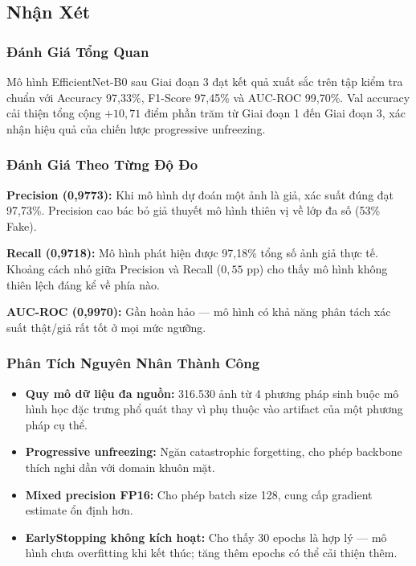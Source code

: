 \subsection{Nhận Xét}

\subsubsection{Đánh Giá Tổng Quan}

Mô hình EfficientNet-B0 sau Giai đoạn 3 đạt kết quả xuất sắc trên tập kiểm tra chuẩn với Accuracy 97,33\%, F1-Score 97,45\% và AUC-ROC 99,70\%. Val accuracy cải thiện tổng cộng $+10{,}71$ điểm phần trăm từ Giai đoạn 1 đến Giai đoạn 3, xác nhận hiệu quả của chiến lược progressive unfreezing.

\subsubsection{Đánh Giá Theo Từng Độ Đo}

\textbf{Precision (0,9773):} Khi mô hình dự đoán một ảnh là giả, xác suất đúng đạt 97,73\%. Precision cao bác bỏ giả thuyết mô hình thiên vị về lớp đa số (53\% Fake).

\textbf{Recall (0,9718):} Mô hình phát hiện được 97,18\% tổng số ảnh giả thực tế. Khoảng cách nhỏ giữa Precision và Recall ($0{,}55$ pp) cho thấy mô hình không thiên lệch đáng kể về phía nào.

\textbf{AUC-ROC (0,9970):} Gần hoàn hảo --- mô hình có khả năng phân tách xác suất thật/giả rất tốt ở mọi mức ngưỡng.

\subsubsection{Phân Tích Nguyên Nhân Thành Công}

\begin{itemize}
  \item \textbf{Quy mô dữ liệu đa nguồn:} 316.530 ảnh từ 4 phương pháp sinh buộc mô hình học đặc trưng phổ quát thay vì phụ thuộc vào artifact của một phương pháp cụ thể.
  \item \textbf{Progressive unfreezing:} Ngăn catastrophic forgetting, cho phép backbone thích nghi dần với domain khuôn mặt.
  \item \textbf{Mixed precision FP16:} Cho phép batch size 128, cung cấp gradient estimate ổn định hơn.
  \item \textbf{EarlyStopping không kích hoạt:} Cho thấy 30 epochs là hợp lý --- mô hình chưa overfitting khi kết thúc; tăng thêm epochs có thể cải thiện thêm.
\end{itemize}

